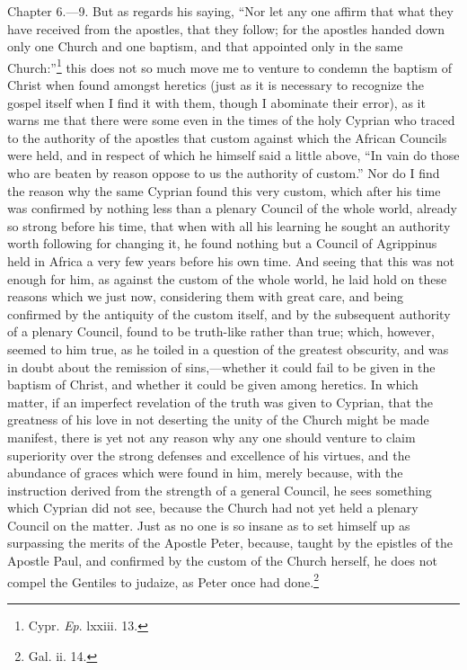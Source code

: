 Chapter 6.—9. But as regards his saying, ``Nor let any one affirm that what they have received from the apostles, that they follow; for the apostles handed down only one Church and one baptism, and that appointed only in the same Church:''\footnote{\par  Cypr. \emph{Ep}. lxxiii. 13.} this does not so much move me to venture to condemn the baptism of Christ when found amongst heretics (just as it is necessary to recognize the gospel itself when I find it with them, though I abominate their error), as it warns me that there were some even in the times of the holy Cyprian who traced to the authority of the apostles that custom against which the African Councils were held, and in respect of which he himself said a little above, ``In vain do those who are beaten by reason oppose to us the authority of custom.'' Nor do I find the reason why the same Cyprian found this very custom, which after his time was confirmed by nothing less than a plenary Council of the whole world, already so strong before his time, that when with all his learning he sought an authority worth following for changing it, he found nothing but a Council of Agrippinus held in Africa a very few years before his own time. And seeing that this was not enough for him, as against the custom of the whole world, he laid hold on these reasons which we just now, considering them with great care, and being confirmed by the antiquity of the custom itself, and by the subsequent authority of a plenary Council, found to be truth-like rather than true; which, however, seemed to him true, as he toiled in a question of the greatest obscurity, and was in doubt about the remission of sins,—whether it could fail to be given in the baptism of Christ, and whether it could be given among heretics. In which matter, if an imperfect revelation of the truth was given to Cyprian, that the greatness of his love in not deserting the unity of the Church might be made manifest, there is yet not any reason why any one should venture to claim superiority over the strong defenses and excellence of his virtues, and the abundance of graces which were found in him, merely because, with the instruction derived from the strength of a general Council, he sees something which Cyprian did not see, because the Church had not yet held a plenary Council on the matter. Just as no one is so insane as to set himself up as surpassing the merits of the Apostle Peter, because, taught by the epistles of the Apostle Paul, and confirmed by the custom of the Church herself, he does not compel the Gentiles to judaize, as Peter once had done.\footnote{\par  Gal. ii. 14.}


